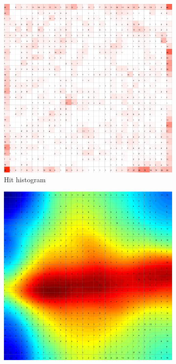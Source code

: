 \documentclass{acm_proc_article-sp}
\begin{document}
\begin{figure}
\begin{subfigure}[b]{0.45\linewidth}
    \includegraphics[width=\linewidth]{img/wine-big-hit-histogram}
    \caption{Hit histogram}
    \label{fig:wine-big-hit-histogram}
\end{subfigure}
\begin{subfigure}[b]{0.45\linewidth}
    \includegraphics[width=\linewidth]{img/wine-big-p-matrix}

\end{subfigure}
\end{figure}
\end{document}
